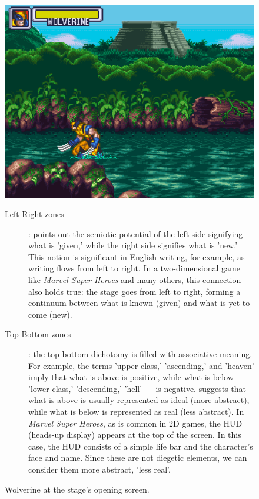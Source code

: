 \documentclass[english]{textolivre}
\begin{document}
\begin{figure}[htbp]
\centering
\begin{minipage}[t]{0.6\textwidth}
\includegraphics[width=\textwidth]{fig-013.png}
\caption{Wolverine at the stage’s opening screen.}
\label{fig13}
\end{minipage}
\begin{minipage}[t]{\textwidth}
\small
\begin{description}
    \item[Left-Right zones]: \textcite[p. 201-2]{van_leeuwen_introducing_2005} points out the semiotic potential of the left side signifying what is 'given,' while the right side signifies what is 'new.' This notion is significant in English writing, for example, as writing flows from left to right. In a two-dimensional game like \textit{Marvel Super Heroes} and many others, this connection also holds true: the stage goes from left to right, forming a continuum between what is known (given) and what is yet to come (new).

    \item[Top-Bottom zones]: the top-bottom dichotomy is filled with associative meaning. For example, the terms 'upper class,' 'ascending,' and 'heaven' imply that what is above is positive, while what is below — 'lower class,' 'descending,' 'hell' — is negative. \textcite[p. 204-5]{van_leeuwen_introducing_2005} suggests that what is above is usually represented as ideal (more abstract), while what is below is represented as real (less abstract). In \textit{Marvel Super Heroes}, as is common in 2D games, the HUD (heads-up display) appears at the top of the screen. In this case, the HUD consists of a simple life bar and the character's face and name. Since these are not diegetic elements, we can consider them more abstract, 'less real'.


\end{description}
\end{minipage}
\end{figure}
\end{document}
